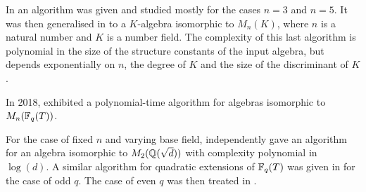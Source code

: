 In \cite{cremona2015explicit} an algorithm was given and studied mostly for the cases \(n=3\) and \(n=5\). It was then generalised in \cite{ivanyos2012splitting,ivanyos2013improved} to a \(K\)-algebra isomorphic to \(M_n(K)\), where \(n\) is a natural number and \(K\) is a number field. The complexity of this last algorithm is polynomial in the size of the structure constants of the input algebra, but depends exponentially on \(n\), the degree of \(K\) and the size of the discriminant of \(K\).

In 2018, \cite{ivanyos2018computing} exhibited a polynomial-time algorithm for algebras isomorphic to \(M_n(\mathbb{F}_q(T))\).

For the case of fixed \(n\) and varying base field, \cite{fisher2017higher,kutas2019splitting} independently gave an algorithm for an algebra isomorphic to \(M_2(\mathbb{Q}(\sqrt{d}))\) with complexity polynomial in \(\log(d)\). A similar algorithm for quadratic extensions of \(\mathbb{F}_q(T)\) was given in \cite{ivanyos2019explicit} for the case of odd \(q\). The case of even \(q\) was then treated in \cite{kutas2022finding}.
